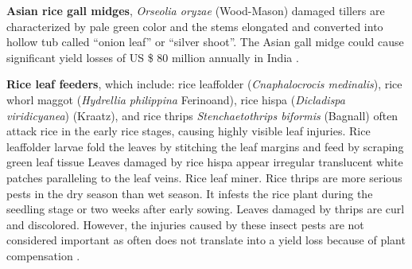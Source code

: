 \textbf{Asian rice gall midges}, \textit{Orseolia oryzae} (Wood-Mason) damaged tillers are characterized by pale green color and the stems elongated and converted into hollow tub called ``onion leaf'' or ``silver shoot''\citep{Pathak_1994_Insect}. The Asian gall midge could cause significant yield losses of US \$ 80 million annually in India \citep{Bennett_2004_New}. 

\textbf{Rice leaf feeders}, which include: rice leaffolder (\textit{Cnaphalocrocis medinalis}), rice whorl maggot (\textit{Hydrellia philippina} Ferinoand), rice hispa (\textit{Dicladispa viridicyanea}) (Kraatz), and  rice thrips \textit{Stenchaetothrips biformis} (Bagnall) often attack rice in the early rice stages, causing highly visible leaf injuries.  Rice leaffolder larvae fold the leaves by stitching the leaf margins and feed by scraping green leaf tissue Leaves damaged by rice hispa appear irregular translucent white patches paralleling to the leaf veins. Rice leaf miner. Rice thrips are more serious pests in the dry season than wet season. It infests the rice plant during the seedling stage or two weeks after early sowing. Leaves damaged by thrips are curl and discolored. However, the injuries caused by these insect pests are not considered important as often does not translate into a yield loss because of plant compensation \citep{Pathak_1994_Insect,Shepard_1995_Rice}. 


